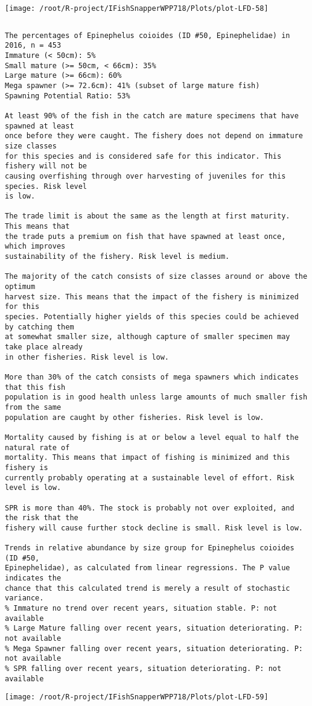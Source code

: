 \documentclass{report}\usepackage[]{graphicx}\usepackage[]{color}
\makeatletter
\def\maxwidth{ %
  \ifdim\Gin@nat@width>\linewidth
    \linewidth
  \else
    \Gin@nat@width
  \fi
}
\newenvironment{kframe}{%
 \def\at@end@of@kframe{}%
 \ifinner\ifhmode%
  \def\at@end@of@kframe{\end{minipage}}%
  \begin{minipage}{\columnwidth}%
 \fi\fi%
 \def\FrameCommand##1{\hskip\@totalleftmargin \hskip-\fboxsep
 \colorbox{shadecolor}{##1}\hskip-\fboxsep
     \hskip-\linewidth \hskip-\@totalleftmargin \hskip\columnwidth}%
 \MakeFramed {\advance\hsize-\width
   \@totalleftmargin\z@ \linewidth\hsize
   \@setminipage}}%
 {\par\unskip\endMakeFramed%
 \at@end@of@kframe}
\newenvironment{knitrout}{}{} %
\makeatother
\begin{document}
\begin{knitrout}
\texttt{[image: /root/R-project/IFishSnapperWPP718/Plots/plot-LFD-58]} 
\begin{kframe}\begin{verbatim}
\end{verbatim}
\end{kframe}
\clearpage
\newpage
\begin{kframe}\begin{verbatim}The percentages of Epinephelus coioides (ID #50, Epinephelidae) in 2016, n = 453
Immature (< 50cm): 5%
Small mature (>= 50cm, < 66cm): 35%
Large mature (>= 66cm): 60%
Mega spawner (>= 72.6cm): 41% (subset of large mature fish)
Spawning Potential Ratio: 53%
 
At least 90% of the fish in the catch are mature specimens that have spawned at least
once before they were caught. The fishery does not depend on immature size classes
for this species and is considered safe for this indicator. This fishery will not be
causing overfishing through over harvesting of juveniles for this species. Risk level
is low.

The trade limit is about the same as the length at first maturity.  This means that
the trade puts a premium on fish that have spawned at least once, which improves
sustainability of the fishery. Risk level is medium.

The majority of the catch consists of size classes around or above the optimum
harvest size. This means that the impact of the fishery is minimized for this
species. Potentially higher yields of this species could be achieved by catching them
at somewhat smaller size, although capture of smaller specimen may take place already
in other fisheries. Risk level is low.

More than 30% of the catch consists of mega spawners which indicates that this fish
population is in good health unless large amounts of much smaller fish from the same
population are caught by other fisheries. Risk level is low.
 
Mortality caused by fishing is at or below a level equal to half the natural rate of
mortality. This means that impact of fishing is minimized and this fishery is
currently probably operating at a sustainable level of effort. Risk level is low.
 
SPR is more than 40%. The stock is probably not over exploited, and the risk that the
fishery will cause further stock decline is small. Risk level is low.
 
Trends in relative abundance by size group for Epinephelus coioides (ID #50,
Epinephelidae), as calculated from linear regressions. The P value indicates the
chance that this calculated trend is merely a result of stochastic variance.
% Immature no trend over recent years, situation stable. P: not available
% Large Mature falling over recent years, situation deteriorating. P: not available
% Mega Spawner falling over recent years, situation deteriorating. P: not available
% SPR falling over recent years, situation deteriorating. P: not available
\end{verbatim}
\end{kframe}
\texttt{[image: /root/R-project/IFishSnapperWPP718/Plots/plot-LFD-59]} 


\end{knitrout}
\end{document}
